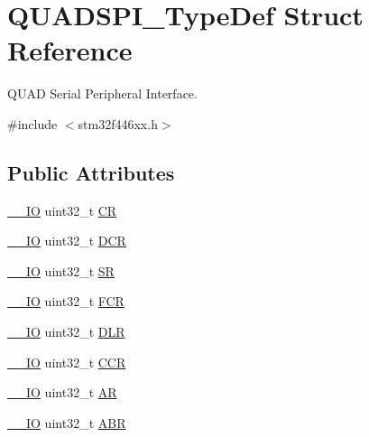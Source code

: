 \hypertarget{struct_q_u_a_d_s_p_i___type_def}{}\section{Q\+U\+A\+D\+S\+P\+I\+\_\+\+Type\+Def Struct Reference}
\label{struct_q_u_a_d_s_p_i___type_def}


Q\+U\+AD Serial Peripheral Interface.  




{\ttfamily \#include $<$stm32f446xx.\+h$>$}

\subsection*{Public Attributes}
\begin{DoxyCompactItemize}
\item 
\hyperlink{core__sc300_8h_aec43007d9998a0a0e01faede4133d6be}{\+\_\+\+\_\+\+IO} uint32\+\_\+t \hyperlink{struct_q_u_a_d_s_p_i___type_def_ad6a1c5cd7b36de02e3969fb9c469beea}{CR}
\item 
\hyperlink{core__sc300_8h_aec43007d9998a0a0e01faede4133d6be}{\+\_\+\+\_\+\+IO} uint32\+\_\+t \hyperlink{struct_q_u_a_d_s_p_i___type_def_a8901a4df6a4d50b741c4544290cbee04}{D\+CR}
\item 
\hyperlink{core__sc300_8h_aec43007d9998a0a0e01faede4133d6be}{\+\_\+\+\_\+\+IO} uint32\+\_\+t \hyperlink{struct_q_u_a_d_s_p_i___type_def_acbabc913eb6a81051e7a73297d1b0756}{SR}
\item 
\hyperlink{core__sc300_8h_aec43007d9998a0a0e01faede4133d6be}{\+\_\+\+\_\+\+IO} uint32\+\_\+t \hyperlink{struct_q_u_a_d_s_p_i___type_def_ace4b7e4af14eec39dec9575d43d28d84}{F\+CR}
\item 
\hyperlink{core__sc300_8h_aec43007d9998a0a0e01faede4133d6be}{\+\_\+\+\_\+\+IO} uint32\+\_\+t \hyperlink{struct_q_u_a_d_s_p_i___type_def_a3993f6897eafcd53b3d9246f970da991}{D\+LR}
\item 
\hyperlink{core__sc300_8h_aec43007d9998a0a0e01faede4133d6be}{\+\_\+\+\_\+\+IO} uint32\+\_\+t \hyperlink{struct_q_u_a_d_s_p_i___type_def_aa2e69474978a87b7a24b4b0e4da3c673}{C\+CR}
\item 
\hyperlink{core__sc300_8h_aec43007d9998a0a0e01faede4133d6be}{\+\_\+\+\_\+\+IO} uint32\+\_\+t \hyperlink{struct_q_u_a_d_s_p_i___type_def_abf9f879cef8fff9883f1654f3cd14125}{AR}
\item 
\hyperlink{core__sc300_8h_aec43007d9998a0a0e01faede4133d6be}{\+\_\+\+\_\+\+IO} uint32\+\_\+t \hyperlink{struct_q_u_a_d_s_p_i___type_def_af989aa29f188fdda929cd5f350ff27c5}{A\+BR}

\end{DoxyCompactItemize}
